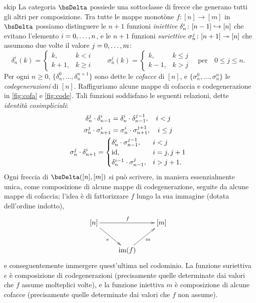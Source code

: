 \begin{hRemark}{skip}\label{rmk_combinatoria_simplessi}
 La categoria \(\bsDelta\) possiede una sottoclasse di frecce che generano tutti gli altri per composizione. Tra tutte le mappe monotòne \(f \colon [n]\to [m]\) in \(\bsDelta\) possiamo distinguere le \(n+1\) funzioni \emph{iniettive} \(\delta_n^i \colon [n-1]\hookrightarrow [n]\) che evitano l'elemento \(i=\iter[0]n\), e le \(n+1\) funzioni \emph{suriettive} \(\sigma_n^j \colon [n+1]\twoheadrightarrow [n]\) che assumono due volte il valore  \(j=\iter[0]m\):
 \[
  \delta_n^i(k) =
  \begin{cases}
   k,   & k < i    \\
   k+1, & k \geq i
  \end{cases}
  \quad \quad
  \sigma_n^j (k) =
  \begin{cases}
   k,   & k \leq j \\
   k-1, & k > j
  \end{cases}
  \quad \text{per} \quad 0 \leq j\leq n.
 \]
 Per ogni \(n\ge 0\), \(\{\delta_n^0,\dots,\delta_n^{n+1}\}\) sono dette le \emph{cofacce} di \([n]\), e \(\{\sigma_n^0,\dots, \sigma_n^n\}\) le \emph{codegenerazioni} di \([n]\). Raffiguriamo alcune mappe di cofaccia e codegenerazione in \autoref{fig:cofa} e \ref{fig:code}. Tali funzioni soddisfano le seguenti relazioni, dette \emph{identità cosimpliciali}:
 \begin{gather*}
  \delta_n^j \cdot \delta_{n-1}^i = \delta_n^i \cdot \delta_{n-1}^{j-1}, \quad i < j\\
  \sigma_n^j \cdot \sigma_{n+1}^i = \sigma_n^i \cdot \sigma_{n+1}^{j+1}, \quad i \leq j\\
  \sigma_n^j \cdot \delta_{n+1}^i =
  \begin{cases}
   \delta_n^i \cdot \sigma_{n-1}^{j-1}, & i < j      \\
   \mathrm{id},                                & i = j, j+1 \\
   \delta_n^{i-1} \cdot \sigma_{n-1}^j, & i > j+1.
  \end{cases}
 \end{gather*}
 Ogni freccia di \(\Hom\bsDelta([n],[m])\) si può scrivere, in maniera essenzialmente unica, come composizione di alcune mappe di codegenerazione, seguite da alcune mappe di cofaccia; l'idea è di fattorizzare \(f\) lungo la sua immagine (dotata dell'ordine indotto),
 \[\xymatrix{
   [n]\ar[rr]^f\ar[dr]_e &&	[m] \\
   & \im(f) \ar[ur]_m
  }\]
 e conseguentemente immergere quest'ultima nel codominio. La funzione suriettiva \(e\) è composizione di codegenerazioni (precisamente quelle determinate dai valori che \(f\) assume molteplici volte), e la funzione iniettiva \(m\) è composizione di alcune cofacce (precisamente quelle determinate dai valori che \(f\) non assume).
\end{hRemark}

